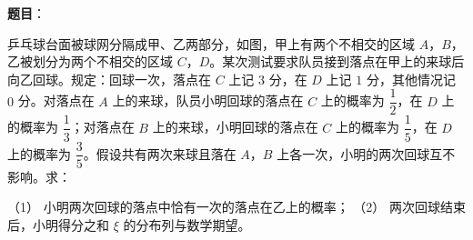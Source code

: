 \begin{answer}

\textbf{题目}：

乒乓球台面被球网分隔成甲、乙两部分，如图，甲上有两个不相交的区域 $A$，$B$，乙被划分为两个不相交的区域 $C$，$D$。某次测试要求队员接到落点在甲上的来球后向乙回球。规定：回球一次，落点在 $C$ 上记 $3$ 分，在 $D$ 上记 $1$ 分，其他情况记 $0$ 分。对落点在 $A$ 上的来球，队员小明回球的落点在 $C$ 上的概率为 $\dfrac12$，在 $D$ 上的概率为 $\dfrac13$；对落点在 $B$ 上的来球，小明回球的落点在 $C$ 上的概率为 $\dfrac15$，在 $D$ 上的概率为 $\dfrac35$。假设共有两次来球且落在 $A$，$B$ 上各一次，小明的两次回球互不影响。求：
\nopagebreak[4]
\begin{center}\end{center}
\nopagebreak[4]
（1） 小明两次回球的落点中恰有一次的落点在乙上的概率；
（2） 两次回球结束后，小明得分之和 $\xi$ 的分布列与数学期望。


\end{answer}
